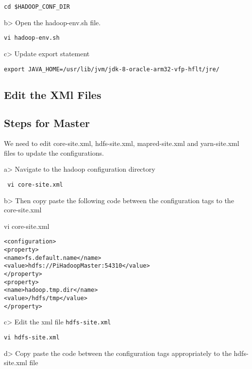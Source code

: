 \begin{lstlisting}
cd $HADOOP_CONF_DIR
\end{lstlisting}

b\textgreater{} Open the hadoop-env.sh file.

\begin{lstlisting}
vi hadoop-env.sh 
\end{lstlisting}

c\textgreater{} Update export statement

\begin{lstlisting}
export JAVA_HOME=/usr/lib/jvm/jdk-8-oracle-arm32-vfp-hflt/jre/
\end{lstlisting}

\subsection{Edit the XMl Files}

\subsection{Steps for Master}

We need to edit core-site.xml, hdfs-site.xml, mapred-site.xml and
yarn-site.xml files to update the configurations.

a\textgreater{} Navigate to the hadoop configuration directory

\begin{lstlisting}
 vi core-site.xml 
\end{lstlisting}

b\textgreater{} Then copy paste the following code between the
configuration tags to the core-site.xml

vi core-site.xml

\begin{lstlisting}
<configuration> 
<property> 
<name>fs.default.name</name> 
<value>hdfs://PiHadoopMaster:54310</value>
</property>
<property>
<name>hadoop.tmp.dir</name>
<value>/hdfs/tmp</value>
</property>
\end{lstlisting}

c\textgreater{} Edit the xml file \texttt{hdfs-site.xml}

\begin{lstlisting}
vi hdfs-site.xml
\end{lstlisting}

d\textgreater{} Copy paste the code between the configuration tags
appropriately to the hdfs-site.xml file

